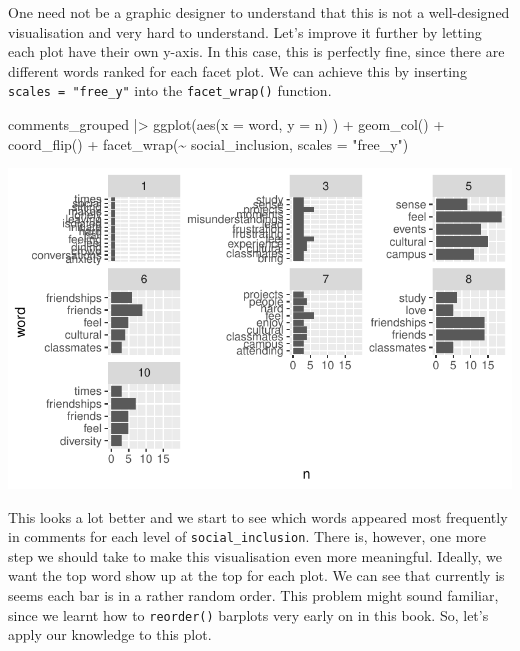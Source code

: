\documentclass[
  letterpaper,
  DIV=11,
  numbers=noendperiod]{scrreprt}
\newenvironment{Shaded}{\begin{snugshade}}{\end{snugshade}}
\newcommand{\AttributeTok}[1]{\textcolor[rgb]{0.40,0.45,0.13}{#1}}
\newcommand{\FunctionTok}[1]{\textcolor[rgb]{0.28,0.35,0.67}{#1}}
\newcommand{\NormalTok}[1]{\textcolor[rgb]{0.00,0.23,0.31}{#1}}
\newcommand{\SpecialCharTok}[1]{\textcolor[rgb]{0.37,0.37,0.37}{#1}}
\newcommand{\StringTok}[1]{\textcolor[rgb]{0.13,0.47,0.30}{#1}}
\begin{document}
One need not be a graphic designer to understand that this is not a
well-designed visualisation and very hard to understand. Let's improve
it further by letting each plot have their own y-axis. In this case,
this is perfectly fine, since there are different words ranked for each
facet plot. We can achieve this by inserting
\texttt{scales\ =\ "free\_y"} into the \texttt{facet\_wrap()} function.

\begin{Shaded}
\begin{Highlighting}[]
\NormalTok{comments\_grouped }\SpecialCharTok{|\textgreater{}}
  \FunctionTok{ggplot}\NormalTok{(}\FunctionTok{aes}\NormalTok{(}\AttributeTok{x =}\NormalTok{ word,}
             \AttributeTok{y =}\NormalTok{ n)}
\NormalTok{         ) }\SpecialCharTok{+}
  \FunctionTok{geom\_col}\NormalTok{() }\SpecialCharTok{+}
  \FunctionTok{coord\_flip}\NormalTok{() }\SpecialCharTok{+}
  \FunctionTok{facet\_wrap}\NormalTok{(}\SpecialCharTok{\textasciitilde{}}\NormalTok{ social\_inclusion,}
             \AttributeTok{scales =} \StringTok{"free\_y"}\NormalTok{)}
\end{Highlighting}
\end{Shaded}

\includegraphics{14_mixed_methods_files/figure-pdf/visualise-social-inclusion-groups-words-n-02-1.pdf}

This looks a lot better and we start to see which words appeared most
frequently in comments for each level of \texttt{social\_inclusion}.
There is, however, one more step we should take to make this
visualisation even more meaningful. Ideally, we want the top word show
up at the top for each plot. We can see that currently is seems each bar
is in a rather random order. This problem might sound familiar, since we
learnt how to \texttt{reorder()} barplots very early on in this book.
So, let's apply our knowledge to this plot.
\end{document}
